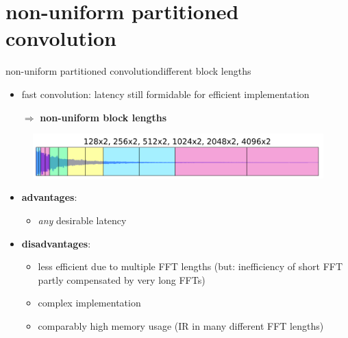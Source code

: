 \section[non-uniform]{non-uniform partitioned convolution}
	\begin{frame}{non-uniform partitioned convolution}{different block lengths}
		\begin{itemize}
			\item	fast convolution: latency still formidable for efficient implementation
			\pause
			\item[$\Rightarrow$] \textbf{non-uniform block lengths}
		\end{itemize}
			\begin{figure}
			\centering
				\includegraphics[scale=.4]{graph/conv_nonuniform}
		\end{figure}
		\pause
		\begin{itemize}
			\item   \textbf{advantages}:
				\begin{itemize}
					\item   \textit{any} desirable latency
				\end{itemize}
			\item   \textbf{disadvantages}:
				\begin{itemize}
					\item   less efficient due to multiple FFT lengths (but: inefficiency of short FFT partly compensated by very long FFTs)
					\item   complex implementation
					\item   comparably high memory usage (IR in many different FFT lengths)
				\end{itemize}
		\end{itemize}

	\end{frame}

